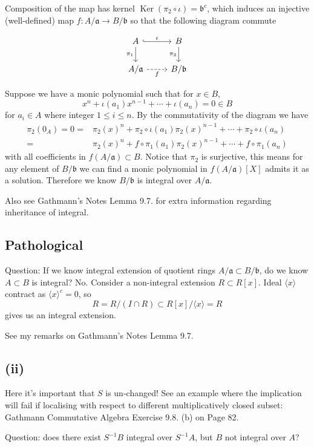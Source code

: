 Composition of the map has kernel $\operatorname{Ker}(\pi_2\circ\iota)= \mathfrak b^c$, which induces an injective (well-defined) map $f:A/\mathfrak a\to B/\mathfrak b$ so that the following diagram commute

\[\begin{tikzcd}
	A & B \\
	{A/\mathfrak a} & {B/\mathfrak b}
	\arrow["{\pi_1}"', from=1-1, to=2-1]
	\arrow["{\pi_2}"', from=1-2, to=2-2]
	\arrow["\iota", hook, from=1-1, to=1-2]
	\arrow["f"', dashed, from=2-1, to=2-2]
\end{tikzcd}\]

Suppose we have a monic polynomial such that for $x\in B$,
\[x^n+\iota(a_1)x^{n-1}+\cdots+\iota(a_n)=0\in B\] for $a_i\in A$ where integer $1\leq i\leq n$. By the commutativity of the diagram we have 
\begin{align*}
    \pi_2(0_A)=0=&\pi_2(x)^n+\pi_2\circ\iota(a_1)\pi_2(x)^{n-1}+\cdots+\pi_2\circ\iota(a_n)\\
    =&\pi_2(x)^n+f\circ\pi_1(a_1)\pi_2(x)^{n-1}+\cdots+f\circ\pi_1(a_n)
\end{align*}with all coefficients in $f(A/\mathfrak a)\subset B$. Notice that $\pi_2$ is surjective, this means for any element of $B/\mathfrak b$ we can find a monic polynomial in $f(A/\mathfrak a)[X]$ admits it as a solution. Therefore we know $B/\mathfrak b$ is integral over $A/\mathfrak a$.

Also see Gathmann's Notes Lemma 9.7. for extra information regarding inheritance of integral.

\subsection{Pathological}

Question: If we know integral extension of quotient rings $A/\mathfrak a\subset B/\mathfrak b$, do we know $A\subset B$ is integral? No. Consider a non-integral extension $R\subset R[x]$. Ideal $\langle x\rangle$ contract as $\langle x\rangle^c=0$, so 
\[R=R/(I\cap R)\subset R[x]/\langle x\rangle=R\] gives us an integral extension.

See my remarks on Gathmann's Notes Lemma 9.7.

\subsection{(ii)}

Here it's important that $S$ is un-changed! See an example where the implication will fail if localising with respect to different multiplicatively closed subset: Gathmann Commutative Algebra Exercise 9.8. (b) on Page 82.

Question: does there exist $S^{-1}B$ integral over $S^{-1}A$, but $B$ not integral over $A$?